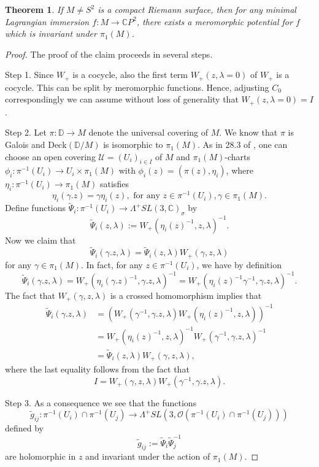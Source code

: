 \documentclass[a4paper,11pt]{amsart}
\newtheorem{theorem}{Theorem}[section]
\theoremstyle{definition}
\numberwithin{equation}{section}
\newcommand{\C}{\mathbb{C}}
\newcommand{\D}{\mathbb{D}}
\begin{document}
\begin{theorem}\label{thm:cpt}
If $M\neq S^2$ is a compact Riemann surface, then for any minimal Lagrangian immersion $f: M\rightarrow \C P^2$,  there exists a meromorphic potential for $f$ which is invariant under $\pi_1(M)$. 
\end{theorem}
\begin{proof}

The proof of the claim proceeds in several steps.

Step 1. Since $W_+$ is a cocycle, also the first term $W_+(z, \lambda = 0)$ 
of $W_+$ is a cocycle. This can be split by meromorphic functions. Hence, adjusting $C_0$ correspondingly we can assume without loss of generality that $W_+(z, \lambda =0) = I$.

Step 2. Let $\pi: \D\rightarrow M$ denote the universal covering of $M$. We know that $\pi$ is Galois and $\mathrm{Deck}(\D/M)$ is isomorphic to $\pi_1(M)$.
As in 28.3 of \cite{Forster}, one can choose an open covering $\mathcal{U}=(U_i)_{i\in I}$ of $M$ and $\pi_1(M)$-charts $\phi_i: \pi^{-1}(U_i)\rightarrow U_i\times \pi_1(M)$ with $\phi_i(z)=(\pi(z), \eta_i)$, where $\eta_i: \pi^{-1}(U_i)\rightarrow \pi_1(M)$ satisfies 
$$\eta_i(\gamma . z)=\gamma\eta_i(z), \text{ for any } z\in \pi^{-1}(U_i), \gamma\in \pi_1(M). $$
Define functions $\tilde{\Psi}_i: \pi^{-1}(U_i)\rightarrow \Lambda^{+}SL(3,\C)_{\sigma}$ by
$$\tilde{\Psi}_i(z, \lambda):=W_{+}(\eta_i(z)^{-1}, z, \lambda)^{-1}.$$
Now we claim that 
$$\tilde{\Psi}_i(\gamma . z,\lambda)=\tilde{\Psi}_i(z, \lambda) W_{+}(\gamma, z,\lambda)$$ 
for any $\gamma\in \pi_1(M)$. In fact, for any $z\in \pi^{-1}(U_i)$, we have by definition
$$\tilde{\Psi}_i(\gamma . z, \lambda)=W_{+}(\eta_i(\gamma . z)^{-1}, \gamma . z, \lambda)^{-1}
=W_{+}(\eta_i(z)^{-1}\gamma^{-1}, \gamma . z, \lambda)^{-1}.$$
The fact that $W_{+}(\gamma, z,\lambda)$ is a crossed homomorphism implies that
\begin{align*}
\tilde{\Psi}_i(\gamma . z, \lambda)&=(W_{+}(\gamma^{-1},\gamma . z, \lambda) W_{+}(\eta_i(z)^{-1},z, \lambda))^{-1}\\
&=W_{+}(\eta_i(z)^{-1},z, \lambda)^{-1}W_{+}(\gamma^{-1}, \gamma . z, \lambda)^{-1}\\
&=\tilde{\Psi}_i(z,\lambda) W_{+}(\gamma, z, \lambda),
\end{align*}
where the last equality follows from the fact that
$$I=W_{+}(\gamma,z, \lambda)W_{+}(\gamma^{-1}, \gamma . z, \lambda).$$

Step 3.  As a consequence we see that the functions
$$\tilde{g}_{ij} : \pi^{-1}(U_i)\cap \pi^{-1}(U_j)\rightarrow \Lambda^{+}SL(3,\mathcal{O}(\pi^{-1}(U_i)\cap \pi^{-1}(U_j)))$$
defined by 
$$\tilde{g}_{ij} :=\tilde{\Psi}_i\tilde{\Psi}_j^{-1}$$
are holomorphic in $z$ and invariant under the action of $\pi_1(M)$. 



\end{proof}
\end{document}
